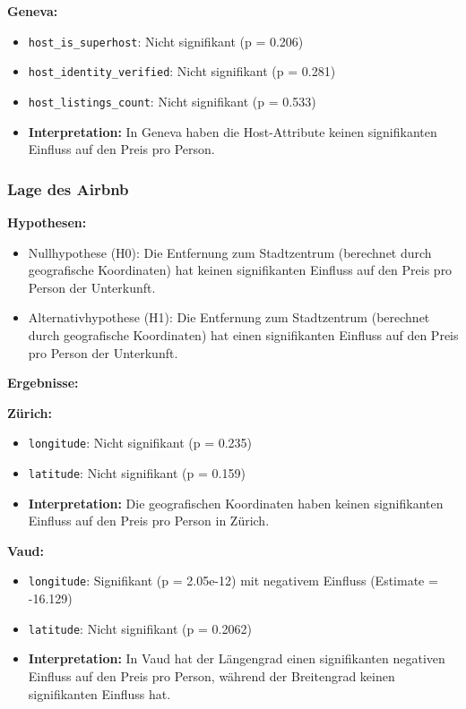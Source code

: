 \documentclass[
  journal,
]{IEEEtran}%
\providecommand{\tightlist}{%
  \setlength{\itemsep}{0pt}\setlength{\parskip}{0pt}}\usepackage{longtable,booktabs,array}
\begin{document}
\textbf{Geneva:}

\begin{itemize}
\item
  \texttt{host\_is\_superhost}: Nicht signifikant (p = 0.206)
\item
  \texttt{host\_identity\_verified}: Nicht signifikant (p = 0.281)
\item
  \texttt{host\_listings\_count}: Nicht signifikant (p = 0.533)
\item
  \textbf{Interpretation:} In Geneva haben die Host-Attribute keinen
  signifikanten Einfluss auf den Preis pro Person.
\end{itemize}

\hypertarget{lage-des-airbnb}{%
\subsubsection{Lage des Airbnb}\label{lage-des-airbnb}}

\textbf{Hypothesen:}

\begin{itemize}
\tightlist
\item
  Nullhypothese (H0): Die Entfernung zum Stadtzentrum (berechnet durch
  geografische Koordinaten) hat keinen signifikanten Einfluss auf den
  Preis pro Person der Unterkunft.
\item
  Alternativhypothese (H1): Die Entfernung zum Stadtzentrum (berechnet
  durch geografische Koordinaten) hat einen signifikanten Einfluss auf
  den Preis pro Person der Unterkunft.
\end{itemize}

\textbf{Ergebnisse:}

\textbf{Zürich:}

\begin{itemize}
\item
  \texttt{longitude}: Nicht signifikant (p = 0.235)
\item
  \texttt{latitude}: Nicht signifikant (p = 0.159)
\item
  \textbf{Interpretation:} Die geografischen Koordinaten haben keinen
  signifikanten Einfluss auf den Preis pro Person in Zürich.
\end{itemize}

\textbf{Vaud:}

\begin{itemize}
\item
  \texttt{longitude}: Signifikant (p = 2.05e-12) mit negativem Einfluss
  (Estimate = -16.129)
\item
  \texttt{latitude}: Nicht signifikant (p = 0.2062)
\item
  \textbf{Interpretation:} In Vaud hat der Längengrad einen
  signifikanten negativen Einfluss auf den Preis pro Person, während der
  Breitengrad keinen signifikanten Einfluss hat.
\end{itemize}
\end{document}
